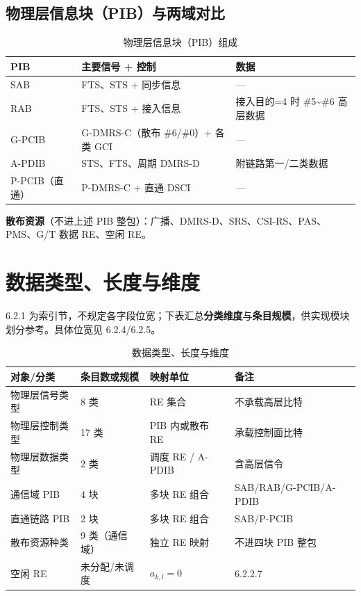 \documentclass[11pt,a4paper]{ctexart}
\begin{document}
\subsection{物理层信息块（PIB）与两域对比}

\begin{longtable}{lll}
\caption{物理层信息块（PIB）组成} \\
\toprule
\textbf{PIB} & \textbf{主要信号 + 控制} & \textbf{数据} \\
\midrule
SAB & FTS、STS + 同步信息 & --- \\
RAB & FTS、STS + 接入信息 & 接入目的=4 时 \#5\textasciitilde\#6 高层数据 \\
G-PCIB & G-DMRS-C（散布 \#6/\#0）+ 各类 GCI & --- \\
A-PDIB & STS、FTS、周期 DMRS-D & 附链路第一/二类数据 \\
P-PCIB（直通） & P-DMRS-C + 直通 DSCI & --- \\
\bottomrule
\end{longtable}

\textbf{散布资源}（不进上述 PIB 整包）：广播、DMRS-D、SRS、CSI-RS、PAS、PMS、G/T 数据 RE、空闲 RE。

\section{数据类型、长度与维度}

6.2.1 为索引节，不规定各字段位宽；下表汇总\textbf{分类维度}与\textbf{条目规模}，供实现模块划分参考。具体位宽见 6.2.4/6.2.5。

\begin{longtable}{llll}
\caption{数据类型、长度与维度} \\
\toprule
\textbf{对象/分类} & \textbf{条目数或规模} & \textbf{映射单位} & \textbf{备注} \\
\midrule
物理层信号类型 & 8 类 & RE 集合 & 不承载高层比特 \\
物理层控制类型 & 17 类 & PIB 内或散布 RE & 承载控制面比特 \\
物理层数据类型 & 2 类 & 调度 RE / A-PDIB & 含高层信令 \\
通信域 PIB & 4 块 & 多块 RE 组合 & SAB/RAB/G-PCIB/A-PDIB \\
直通链路 PIB & 2 块 & 多块 RE 组合 & SAB/P-PCIB \\
散布资源种类 & 9 类（通信域） & 独立 RE 映射 & 不进四块 PIB 整包 \\
空闲 RE & 未分配/未调度 & $a_{k,l}{=}0$ & 6.2.2.7 \\
\bottomrule
\end{longtable}
\end{document}

